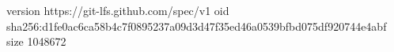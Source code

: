 version https://git-lfs.github.com/spec/v1
oid sha256:d1fe0ac6ca58b4c7f0895237a09d3d47f35ed46a0539bfbd075df920744e4abf
size 1048672
